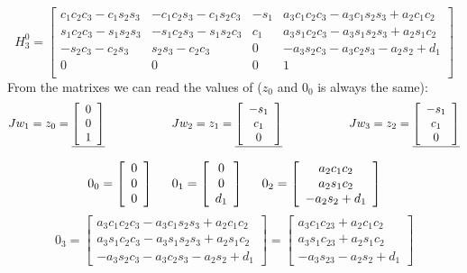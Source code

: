 \documentclass[12pt,norsk,a4paper]{article}
\begin{document}
            \[H_3^0 = 
            \left[ \begin{array}{cccc}
            c_1c_2c_3-c_1s_2s_3 & -c_1c_2s_3-c_1s_2c_3 & -s_1 & a_3c_1c_2c_3-a_3c_1s_2s_3+a_2c_1c_2 \\
            s_1c_2c_3-s_1s_2s_3 & -s_1c_2s_3-s_1s_2c_3 & c_1 & a_3s_1c_2c_3-a_3s_1s_2s_3+a_2s_1c_2 \\
            -s_2c_3-c_2s_3 & s_2s_3-c_2c_3 & 0 & -a_3s_2c_3-a_3c_2s_3-a_2s_2+d_1 \\
            0 & 0 & 0 & 1 \\
            \end{array} \right]\]
    From the matrixes we can read the values of ($z_0$ and $0_0$ is always the same):\\
    \[Jw_1 = z_0 = \underline{\left[\begin{array}{c}
        0 \\ 0 \\ 1
    \end{array}\right]}
    \hspace{20mm}
    Jw_2 = z_1 = \underline{\left[\begin{array}{c}
        -s_1 \\ c_1 \\ 0
    \end{array}\right]}
    \hspace{20mm}
    Jw_3 = z_2 = \underline{\left[\begin{array}{c}
        -s_1 \\ c_1 \\ 0
    \end{array}\right]}\]

    \[0_0 = \left[\begin{array}{c}
        0 \\ 0 \\ 0
    \end{array}\right]
    \hspace{5mm}
    0_1 = \left[\begin{array}{c}
        0 \\ 0 \\ d_1
    \end{array}\right]
    \hspace{5mm}
    0_2 = \left[\begin{array}{c}
        a_2c_1c_2 \\ a_2s_1c_2 \\ -a_2s_2+d_1
    \end{array}\right]\]
    \[0_3 = \left[\begin{array}{c}
        a_3c_1c_2c_3-a_3c_1s_2s_3+a_2c_1c_2 \\ a_3s_1c_2c_3-a_3s_1s_2s_3+a_2s_1c_2 \\ -a_3s_2c_3-a_3c_2s_3-a_2s_2+d_1
    \end{array}\right] = 
    \left[\begin{array}{c}
        a_3c_1c_{23}+a_2c_1c_2 \\ a_3s_1c_{23}+a_2s_1c_2 \\ -a_3s_{23}-a_2s_2+d_1
    \end{array}\right]\]
\end{document}
